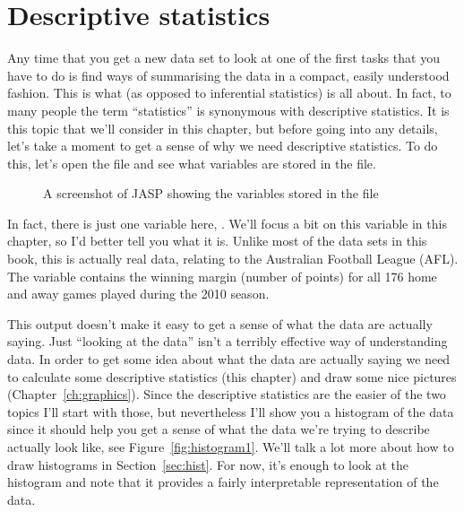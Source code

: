 
\chapter{Descriptive statistics\label{ch:descriptives}}

Any time that you get a new data set to look at one of the first tasks that you have to do is find ways of summarising the data in a compact, easily understood fashion. This is what  (as opposed to inferential statistics) is all about. In fact, to many people the term ``statistics'' is synonymous with descriptive statistics. It is this topic that we'll consider in this chapter, but before going into any details, let's take a moment to get a sense of why we need descriptive statistics. To do this, let's open the  file and see what variables are stored in the file.

\vspace{0.5cm}
\begin{figure}[htb]
\begin{center}
\caption{A screenshot of JASP showing the variables stored in the  file}
\label{fig:aflsmall}
\HR
\end{center}
\end{figure}

In fact, there is just one variable here, . We'll focus a bit on this variable in this chapter, so I'd better tell you what it is. Unlike most of the data sets in this book, this is actually real data, relating to the Australian Football League (AFL). The  variable contains the winning margin (number of points) for all 176 home and away games played during the 2010 season. 

This output doesn't make it easy to get a sense of what the data are actually saying. Just ``looking at the data'' isn't a terribly effective way of understanding data. In order to get some idea about what the data are actually saying we need to calculate some descriptive statistics (this chapter) and draw some nice pictures (Chapter~\ref{ch:graphics}). Since the descriptive statistics are the easier of the two topics I'll start with those, but nevertheless I'll show you a histogram of the  data since it should help you get a sense of what the data we're trying to describe actually look like, see Figure~\ref{fig:histogram1}. We'll talk a lot more about how to draw histograms in Section~\ref{sec:hist}. For now, it's enough to look at the histogram and note that it provides a fairly interpretable representation of the  data.

